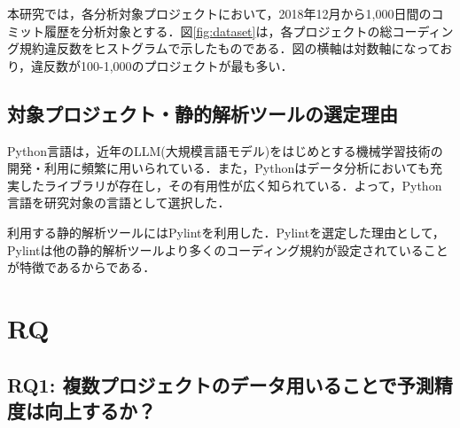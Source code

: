 \documentclass[11pt,dvipdfmx]{jreport}
\begin{document}
本研究では，各分析対象プロジェクトにおいて，2018年12月から1,000日間のコミット履歴を分析対象とする．図\ref{fig:dataset}は，各プロジェクトの総コーディング規約違反数をヒストグラムで示したものである．図の横軸は対数軸になっており，違反数が100-1,000のプロジェクトが最も多い．

\subsection{対象プロジェクト・静的解析ツールの選定理由}

Python言語は，近年のLLM(大規模言語モデル)をはじめとする機械学習技術の開発・利用に頻繁に用いられている．また，Pythonはデータ分析においても充実したライブラリが存在し，その有用性が広く知られている．よって，Python言語を研究対象の言語として選択した．

利用する静的解析ツールにはPylintを利用した．Pylintを選定した理由として，Pylintは他の静的解析ツールより多くのコーディング規約が設定されていることが特徴であるからである．


\section{RQ}

\subsection{RQ1: 複数プロジェクトのデータ用いることで予測精度は向上するか？}

\begin{table}{}
    \centering
    \caption{各手法による評価指標で最も高い値で予測したプロジェクト数の一覧}
    \label{tab:gen}
    \vspace{3mm}
\end{table}
\end{document}
